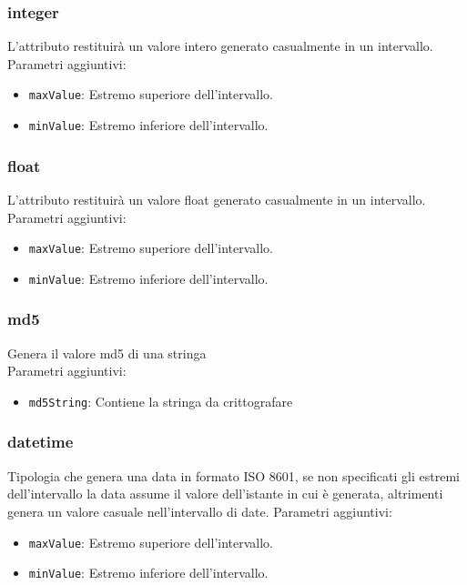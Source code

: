 \documentclass[12pt,a4paper,italian]{article}
\begin{document}
\subsubsection{integer} L'attributo restituirà un valore intero generato casualmente in un intervallo.\\
Parametri aggiuntivi:
\begin{itemize}
	\item \texttt{maxValue}: Estremo superiore dell'intervallo.
	\item \texttt{minValue}: Estremo inferiore dell'intervallo.
\end{itemize}
\subsubsection{float} L'attributo restituirà un valore float generato casualmente in un intervallo.\\
Parametri aggiuntivi:
\begin{itemize}
	\item \texttt{maxValue}: Estremo superiore dell'intervallo.
	\item \texttt{minValue}: Estremo inferiore dell'intervallo.
\end{itemize}
\subsubsection{md5} Genera il valore md5 di una stringa\\
Parametri aggiuntivi:
\begin{itemize}
	\item \texttt{md5String}: Contiene la stringa da crittografare
\end{itemize}
\subsubsection{datetime} 
Tipologia che genera una data in formato ISO 8601, se non specificati gli estremi dell'intervallo la data assume il valore dell'istante in cui è generata, altrimenti genera un valore casuale nell'intervallo di date.
Parametri aggiuntivi:
\begin{itemize}
	\item \texttt{maxValue}: Estremo superiore dell'intervallo.
	\item \texttt{minValue}: Estremo inferiore dell'intervallo.
\end{itemize}
\end{document}
